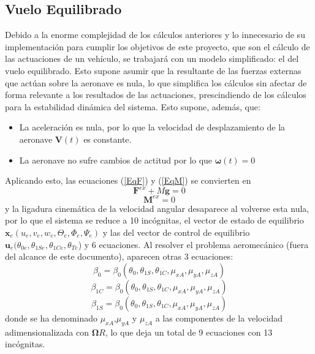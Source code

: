 \subsection{Vuelo Equilibrado}

Debido a la enorme complejidad de los cálculos anteriores y lo innecesario de su implementación para cumplir los objetivos de este proyecto, que son el cálculo de las actuaciones de un vehículo, se trabajará con un modelo simplificado: el del vuelo equilibrado. Esto supone asumir que la resultante de las fuerzas externas que actúan sobre la aeronave es nula, lo que simplifica los cálculos sin afectar de forma relevante a los resultados de las actuaciones, prescindiendo de los cálculos para la estabilidad dinámica del sistema.
Esto supone, además, que:
\begin{itemize}
	\item La aceleración es nula, por lo que la velocidad de desplazamiento de la aeronave $\mathrm{\textbf{V}}(t)$ es constante.
	\item La aeronave no sufre cambios de actitud por lo que $\boldsymbol{\omega}(t)=0$
\end{itemize}
Aplicando esto, las ecuaciones (\ref{EqF}) y (\ref{EqM}) se convierten en
\begin{equation}
	\mathrm{\textbf{F}}^{ex}+M\mathrm{\textbf{g}}=0
	\label{EqFe}
\end{equation}
\begin{equation}
	\mathrm{\textbf{M}}^{ex}=0
	\label{EqMe}
\end{equation}
y la ligadura cinemática de la velocidad angular desaparece al volverse esta nula, por lo que el sistema se reduce a 10 incógnitas, el vector de estado de equilibrio $\mathrm{\textbf{x}}_e(u_e, v_e, w_e, \Theta_e, \Phi_e, \Psi_e)$ y las del vector de control de equilibrio $\mathrm{\textbf{u}}_e(\theta_{0e}, \theta_{1Se}, \theta_{1Ce}, \theta_{Te}$) y 6 ecuaciones.
Al resolver el problema aeromecánico (fuera del alcance de este documento), aparecen otras 3 ecuaciones:
\begin{equation}
\beta_0=\beta_0(\theta_0,\theta_{1S},\theta_{1C},\mu_{xA},\mu_{yA},\mu_{zA})
\label{beta0}
\end{equation}
\begin{equation}
\beta_{1C}=\beta_0(\theta_0,\theta_{1S},\theta_{1C},\mu_{xA},\mu_{yA},\mu_{zA})
\label{beta1c}
\end{equation}
\begin{equation}
\beta_{1S}=\beta_0(\theta_0,\theta_{1S},\theta_{1C},\mu_{xA},\mu_{yA},\mu_{zA})
\label{beta1s}
\end{equation}
donde se ha denominado $\mu_{xA}$,$\mu_{yA}$ y $\mu_{zA}$ a las componentes de la velocidad adimensionalizada con $\boldsymbol{\Omega}R$, lo que deja un total de 9 ecuaciones con 13 incógnitas.

